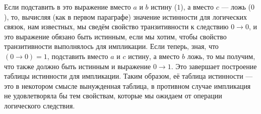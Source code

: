 Если подставить в это выражение вместо $a$ и $b$ истину ($1$), а вместо $c$ — ложь ($0$), то, вычисляя (как в первом параграфе) значение истинности для логических связок, нам известных, мы сведём свойство транзитивности к следствию $0 \to 0$, и это выражение обязано быть истинным, если мы хотим, чтобы свойство транзитивности выполнялось для импликации. Если теперь, зная, что $(0 \to 0) = 1$, подставить вместо $a$ и $c$ истину, а вместо $b$ ложь, то мы получим, что также должно быть истинным и выражение $0 \to 1$. Это завершает построение таблицы истинности для импликации. Таким образом, её таблица истинности — это в некотором смысле вынужденная таблица, в противном случае импликация не удовлетворяла бы тем свойствам, которые мы ожидаем от операции логического следствия.
